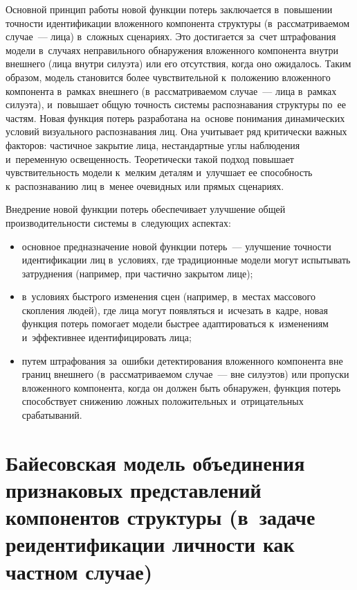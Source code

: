 Основной принцип работы новой функции потерь заключается в~повышении
точности идентификации вложенного компонента структуры (в~рассматриваемом
случае~--- лица) в~сложных сценариях. Это достигается
за~счет штрафования модели в~случаях неправильного обнаружения вложенного
компонента внутри внешнего (лица внутри силуэта) или его отсутствия, когда
оно ожидалось. Таким образом,
модель становится более чувствительной к~положению вложенного компонента
в~рамках внешнего (в~рассматриваемом случае~--- лица в~рамках силуэта),
и~повышает общую точность системы распознавания структуры по~ее частям. Новая
функция потерь разработана на~основе понимания динамических условий
визуального распознавания лиц. Она учитывает ряд критически важных
факторов: частичное закрытие лица, нестандартные углы наблюдения
и~переменную освещенность. Теоретически такой подход повышает
чувствительность модели к~мелким деталям и~улучшает ее способность
к~распознаванию лиц в~менее очевидных или прямых сценариях.

Внедрение новой функции потерь обеспечивает улучшение общей
производительности системы в~следующих аспектах:
\begin{itemize}
    \item основное предназначение новой функции потерь~--- улучшение
          точности идентификации лиц в~условиях, где традиционные
          модели могут испытывать затруднения (например, при частично
          закрытом лице);
    \item в~условиях быстрого изменения сцен (например, в~местах
          массового скопления людей), где лица могут появляться
          и~исчезать в~кадре, новая функция потерь помогает модели
          быстрее адаптироваться к~изменениям и~эффективнее
          идентифицировать лица;
    \item путем штрафования за~ошибки детектирования вложенного компонента вне
          границ внешнего (в~рассматриваемом случае~--- вне силуэтов) или
          пропуски вложенного компонента, когда он должен быть обнаружен,
          функция
          потерь способствует снижению ложных положительных
          и~отрицательных срабатываний.
\end{itemize}

\section{Байесовская модель объединения признаковых представлений компонентов структуры (в~задаче реидентификации личности как частном случае)}\label{sec:ch2/bayes}

